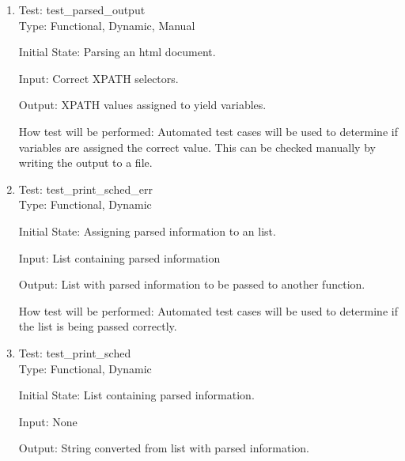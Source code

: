 \documentclass[12pt, titlepage]{article}
\begin{document}
\begin{enumerate}


\color{blue}\item{Test: test\_parsed\_output\\}\color{black}
Type: Functional, Dynamic, \color{blue}Manual\color{black}
					
Initial State: Parsing an html document.
					
Input: Correct XPATH selectors.
					
Output: XPATH values assigned to yield variables.
					
How test will be performed: Automated test cases will be used to determine if variables are assigned the correct value. \color{blue}This can be checked manually by writing the output to a file.\color{black}\\
\color{blue}\item{Test: test\_print\_sched\_err\\}\color{black}
Type: Functional, Dynamic
					
Initial State: Assigning parsed information to an list.
					
Input: List containing parsed information
					
Output: List with parsed information to be passed to another function.
					
How test will be performed: Automated test cases will be used to determine if the list is being passed correctly.\\

\color{blue}\item{Test: test\_print\_sched\\}
Type: Functional, Dynamic
					
Initial State: List containing parsed information.
					
Input: None
					
Output: String converted from list with parsed information.
					

\end{enumerate}
\end{document}
